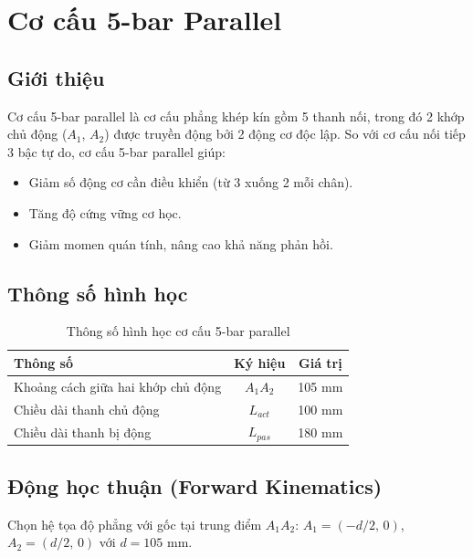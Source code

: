 \section{Cơ cấu 5-bar Parallel}

\subsection{Giới thiệu}

Cơ cấu 5-bar parallel là cơ cấu phẳng khép kín gồm 5 thanh nối, trong đó 2
khớp chủ động ($A_1$, $A_2$) được truyền động bởi 2 động cơ độc lập.
So với cơ cấu nối tiếp 3 bậc tự do, cơ cấu 5-bar parallel giúp:

\begin{itemize}
    \item Giảm số động cơ cần điều khiển (từ 3 xuống 2 mỗi chân).
    \item Tăng độ cứng vững cơ học.
    \item Giảm momen quán tính, nâng cao khả năng phản hồi.
\end{itemize}

\subsection{Thông số hình học}

\begin{table}[H]
\centering
\caption{Thông số hình học cơ cấu 5-bar parallel}
\label{tab:5bar_params}
\renewcommand{\arraystretch}{1.3}
\begin{tabular}{|l|c|c|}
\hline
\textbf{Thông số} & \textbf{Ký hiệu} & \textbf{Giá trị} \\
\hline
Khoảng cách giữa hai khớp chủ động & $A_1A_2$ & 105 mm \\
Chiều dài thanh chủ động & $L_{act}$ & 100 mm \\
Chiều dài thanh bị động  & $L_{pas}$ & 180 mm \\
\hline
\end{tabular}
\end{table}

\subsection{Động học thuận (Forward Kinematics)}

Chọn hệ tọa độ phẳng với gốc tại trung điểm $A_1A_2$:
$A_1 = (-d/2,\,0)$, $A_2 = (d/2,\,0)$ với $d = 105$ mm.

